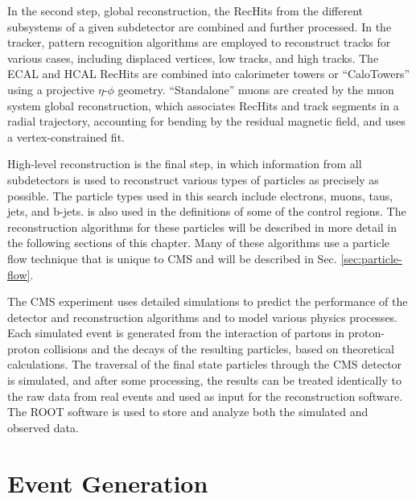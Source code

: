In the second step, global reconstruction, the RecHits from the different subsystems of a given subdetector are combined and further processed. In the tracker, pattern recognition algorithms are employed to reconstruct tracks for various cases, including displaced vertices, low \pt tracks, and high \pt tracks. The ECAL and HCAL RecHits are combined into calorimeter towers or ``CaloTowers'' using a projective $\eta$-$\phi$ geometry. ``Standalone'' muons are created by the muon system global reconstruction, which associates RecHits and track segments in a radial trajectory, accounting for bending by the residual magnetic field, and uses a vertex-constrained fit.

High-level reconstruction is the final step, in which information from all subdetectors is used to reconstruct various types of particles as precisely as possible. The particle types used in this search include electrons, muons, taus, jets, and b-jets. \met is also used in the definitions of some of the control regions. The reconstruction algorithms for these particles will be described in more detail in the following sections of this chapter. Many of these algorithms use a particle flow technique that is unique to CMS and will be described in Sec. \ref{sec:particle-flow}.

The CMS experiment uses detailed simulations to predict the performance of the detector and reconstruction algorithms and to model various physics processes. Each simulated event is generated from the interaction of partons in proton-proton collisions and the decays of the resulting particles, based on theoretical calculations. The traversal of the final state particles through the CMS detector is simulated, and after some processing, the results can be treated identically to the raw data from real events and used as input for the reconstruction software. The ROOT software \cite{Brun199781} is used to store and analyze both the simulated and observed data.

\section{Event Generation}

